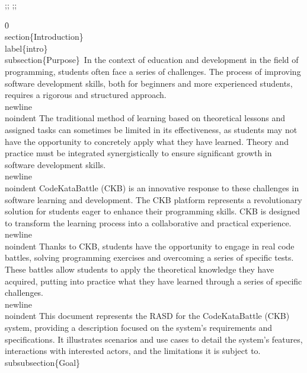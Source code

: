 {\ansi{}
{;;}
{\*\expandedcolortbl;;}
\pard{}\pardirnatural{}

\f0  \\section\{Introduction\}\\label\{intro\}\
\\subsection\{Purpose\}\
In the context of education and development in the field of programming, students often face a series of challenges. The process of improving software development skills, both for beginners and more experienced students, requires a rigorous and structured approach.\\newline\
\
\\noindent The traditional method of learning based on theoretical lessons and assigned tasks can sometimes be limited in its effectiveness, as students may not have the opportunity to concretely apply what they have learned. Theory and practice must be integrated synergistically to ensure significant growth in software development skills.\
\\newline\
\
\\noindent CodeKataBattle (CKB) is an innovative response to these challenges in software learning and development. The CKB platform represents a revolutionary solution for students eager to enhance their programming skills. CKB is designed to transform the learning process into a collaborative and practical experience.\
\\newline\
\
\\noindent Thanks to CKB, students have the opportunity to engage in real code battles, solving programming exercises and overcoming a series of specific tests. These battles allow students to apply the theoretical knowledge they have acquired, putting into practice what they have learned through a series of specific challenges.\
\\newline\
\
\\noindent This document represents the RASD for the CodeKataBattle (CKB) system, providing a description focused on the system's requirements and specifications. It illustrates scenarios and use cases to detail the system's features, interactions with interested actors, and the limitations it is subject to.\
\
\\subsubsection\{Goal\}\
}
